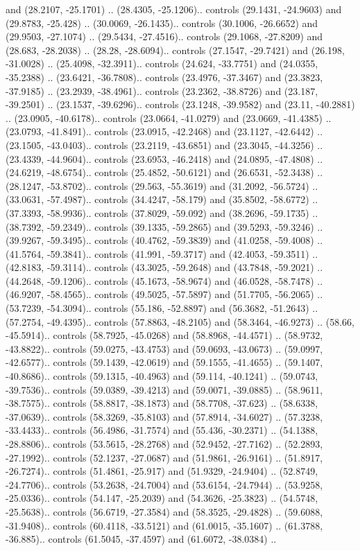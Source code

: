 {{{\begin{scope}[y=1cm, x=1cm, inner sep=0pt, outer sep=0pt]
\begin{scope}[yscale=\globalscale,xscale=\globalscale, every node/.append style={scale=\globalscale}]
\begin{scope}[shift={(-41.073, 40.36605)}]
and (28.2107, -25.1701) .. (28.4305, -25.1206).. controls (29.1431, -24.9603) and (29.8783, -25.428) .. (30.0069, -26.1435).. controls (30.1006, -26.6652) and (29.9503, -27.1074) .. (29.5434, -27.4516).. controls (29.1068, -27.8209) and (28.683, -28.2038) .. (28.28, -28.6094).. controls (27.1547, -29.7421) and (26.198, -31.0028) .. (25.4098, -32.3911).. controls (24.624, -33.7751) and (24.0355, -35.2388) .. (23.6421, -36.7808).. controls (23.4976, -37.3467) and (23.3823, -37.9185) .. (23.2939, -38.4961).. controls (23.2362, -38.8726) and (23.187, -39.2501) .. (23.1537, -39.6296).. controls (23.1248, -39.9582) and (23.11, -40.2881) .. (23.0905, -40.6178).. controls (23.0664, -41.0279) and (23.0669, -41.4385) .. (23.0793, -41.8491).. controls (23.0915, -42.2468) and (23.1127, -42.6442) .. (23.1505, -43.0403).. controls (23.2119, -43.6851) and (23.3045, -44.3256) .. (23.4339, -44.9604).. controls (23.6953, -46.2418) and (24.0895, -47.4808) .. (24.6219, -48.6754).. controls (25.4852, -50.6121) and (26.6531, -52.3438) .. (28.1247, -53.8702).. controls (29.563, -55.3619) and (31.2092, -56.5724) .. (33.0631, -57.4987).. controls (34.4247, -58.179) and (35.8502, -58.6772) .. (37.3393, -58.9936).. controls (37.8029, -59.092) and (38.2696, -59.1735) .. (38.7392, -59.2349).. controls (39.1335, -59.2865) and (39.5293, -59.3246) .. (39.9267, -59.3495).. controls (40.4762, -59.3839) and (41.0258, -59.4008) .. (41.5764, -59.3841).. controls (41.991, -59.3717) and (42.4053, -59.3511) .. (42.8183, -59.3114).. controls (43.3025, -59.2648) and (43.7848, -59.2021) .. (44.2648, -59.1206).. controls (45.1673, -58.9674) and (46.0528, -58.7478) .. (46.9207, -58.4565).. controls (49.5025, -57.5897) and (51.7705, -56.2065) .. (53.7239, -54.3094).. controls (55.186, -52.8897) and (56.3682, -51.2643) .. (57.2754, -49.4395).. controls (57.8863, -48.2105) and (58.3464, -46.9273) .. (58.66, -45.5914).. controls (58.7925, -45.0268) and (58.8968, -44.4571) .. (58.9732, -43.8822).. controls (59.0275, -43.4753) and (59.0693, -43.0673) .. (59.0997, -42.6577).. controls (59.1439, -42.0619) and (59.1555, -41.4655) .. (59.1407, -40.8686).. controls (59.1315, -40.4963) and (59.114, -40.1241) .. (59.0743, -39.7536).. controls (59.0389, -39.4213) and (59.0071, -39.0885) .. (58.9611, -38.7575).. controls (58.8817, -38.1873) and (58.7708, -37.623) .. (58.6338, -37.0639).. controls (58.3269, -35.8103) and (57.8914, -34.6027) .. (57.3238, -33.4433).. controls (56.4986, -31.7574) and (55.436, -30.2371) .. (54.1388, -28.8806).. controls (53.5615, -28.2768) and (52.9452, -27.7162) .. (52.2893, -27.1992).. controls (52.1237, -27.0687) and (51.9861, -26.9161) .. (51.8917, -26.7274).. controls (51.4861, -25.917) and (51.9329, -24.9404) .. (52.8749, -24.7706).. controls (53.2638, -24.7004) and (53.6154, -24.7944) .. (53.9258, -25.0336).. controls (54.147, -25.2039) and (54.3626, -25.3823) .. (54.5748, -25.5638).. controls (56.6719, -27.3584) and (58.3525, -29.4828) .. (59.6088, -31.9408).. controls (60.4118, -33.5121) and (61.0015, -35.1607) .. (61.3788, -36.885).. controls (61.5045, -37.4597) and (61.6072, -38.0384) .. 
\end{scope}
\end{scope}
\end{scope}}}}
